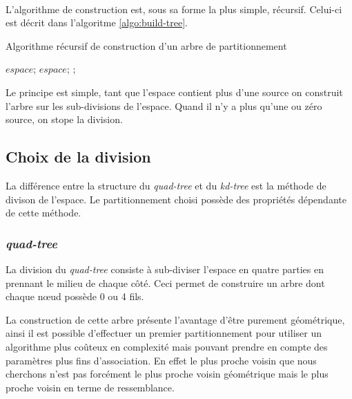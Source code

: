 \

L'algorithme de construction est, sous sa forme la plus simple, récursif. Celui-ci est décrit dans l'algoritme \ref{algo:build-tree}.

	\begin{algorithm}
		\caption{Algorithme récursif de construction d'un arbre de partitionnement}
		\label{algo:build-tree}
		\begin{algorithmic}[1]
					\State \Return $espace$;
					\State \Return $espace$;
				\Else
					\State \Return {};
				\EndIf
			\EndFunction
		\end{algorithmic}
	\end{algorithm}

Le principe est simple, tant que l'espace contient plus d'une source on construit l'arbre sur les sub-divisions de l'espace. Quand il n'y a plus qu'une ou zéro source, on stope la division.


	\subsection{Choix de la division}

La différence entre la structure du \emph{quad-tree} et du \emph{kd-tree} est la méthode de divison de l'espace. Le partitionnement choisi possède des propriétés dépendante de cette méthode.

		\subsubsection{\emph{quad-tree}}

La division du \emph{quad-tree} consiste à sub-diviser l'espace en quatre parties en prennant le milieu de chaque côté. Ceci permet de construire un arbre dont chaque n\oe{}ud possède 0 ou 4 fils.

La construction de cette arbre présente l'avantage d'être purement géométrique, ainsi il est possible d'effectuer un premier partitionnement pour utiliser un algorithme plus coûteux en complexité mais pouvant prendre en compte des paramètres plus fins d'association. En effet le plus proche voisin que nous cherchons n'est pas forcément le plus proche voisin géométrique mais le plus proche voisin en terme de ressemblance.

